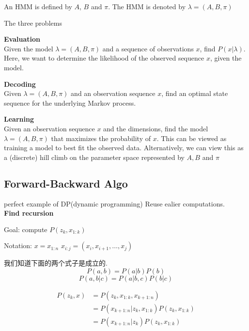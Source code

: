 \documentclass{article}
\begin{document}
An HMM is defined by $A$, $B$ and $\pi$. The HMM is denoted by $\lambda = (A,B,\pi)$

The three problems
\begin{problem}
\textbf{Evaluation}\\
Given the model $\lambda = (A,B,\pi)$ and a sequence of observations $x$, find $P(x|\lambda)$. Here, we
want to determine the likelihood of the observed sequence $x$, given the model.
\end{problem}

\begin{problem}
\textbf{Decoding}\\
Given $\lambda = (A,B,\pi)$ and an observation sequence $x$, find an optimal state sequence for the underlying Markov process.
\end{problem}

\begin{problem}
\textbf{Learning}\\
Given an observation sequence $x$ and the dimensions, find the model $\lambda = (A,B,\pi)$ that maximizes the probability of $x$.  
This can be viewed as training a model to best fit the observed data. Alternatively, we can view this as a (discrete) hill climb on the parameter
space represented by $A,B$ and $\pi$
\end{problem}

\subsection{Forward-Backward Algo}
perfect example of DP(dynamic programming) Reuse ealier computations.\\
\textbf{Find recursion}

Goal: compute $P(z_k, x_{1:k})$

Notation: 
$x = x_{1:n}$
$x_{i:j} = (x_i, x_{i+1}, \ldots, x_j)$

我们知道下面的两个式子是成立的.
$$P(a,b) = P(a|b)P(b)$$
$$P(a,b|c) = P(a|b,c)P(b|c)$$

$$
\begin{aligned}
P(z_k,x)
& = P(z_k, x_{1:k}, x_{k+1:n}) \\ 
& = P(x_{k+1:n}|z_k, x_{1:k} ) P(z_k, x_{1:k} ) \\ 
& = P(x_{k+1:n}|z_k) P(z_k, x_{1:k} ) \\ 
\end{aligned}
$$
\end{document}

